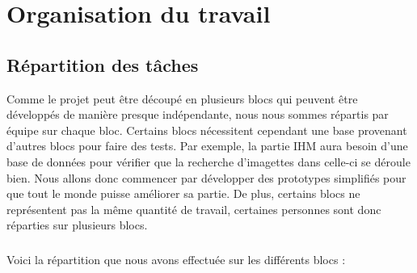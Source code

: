 \chapter{Organisation du travail}

\section{Répartition des tâches}

Comme le projet peut être découpé en plusieurs blocs qui peuvent être
développés de manière presque indépendante, nous nous sommes répartis
par équipe sur chaque bloc. Certains blocs nécessitent
cependant une base provenant d’autres blocs pour faire des tests.
Par exemple, la partie IHM aura besoin d’une base de données pour
vérifier que la recherche d’imagettes dans celle-ci se déroule bien.
Nous allons donc commencer par développer des prototypes simplifiés
pour que tout le monde puisse améliorer sa partie. De plus, certains 
blocs ne représentent pas la même quantité de travail, certaines 
personnes sont donc réparties sur plusieurs blocs.

\paragraph{}
Voici la répartition que nous avons effectuée sur les différents blocs :

